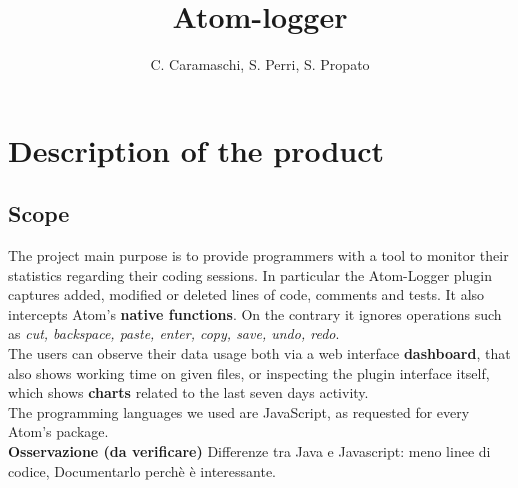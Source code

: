 \documentclass[a4paper,10pt]{report}
\title{Atom-logger}
\author{C. Caramaschi, S. Perri, S. Propato}
\begin{document}
\maketitle
\tableofcontents

\newpage
\chapter{Description of the product} %
\section{Scope}

The project main purpose is to provide programmers with a tool to monitor their statistics regarding their coding sessions.
	In particular the Atom-Logger plugin captures added, modified or deleted lines of code, comments and tests. It also intercepts Atom's \textbf{native functions}. On the contrary it ignores operations such as \emph{cut, backspace, paste, enter, copy, save, undo, redo}.\\
	The users can observe their data usage both via a web interface \textbf{dashboard}, that also shows working time on given files, or inspecting the plugin interface itself, which shows \textbf{charts} related to the last seven days activity.\\
The programming languages we used are JavaScript, as requested for every Atom's package.\\
\textbf{Osservazione (da verificare)} Differenze tra Java e Javascript: meno linee di codice, Documentarlo perchè è interessante.\\ %
\end{document}
